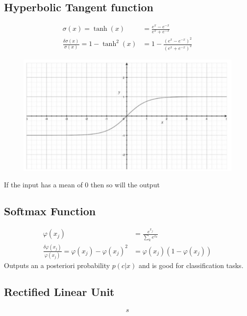 \subsection{Hyperbolic Tangent function}
\label{ssect:hyperbolic-tangent-function}
\begin{align*}
\sigma(x) = \tanh(x) &= \frac{e^x - e^{-x}}{e^x + e^{-x}} \\
\frac{\delta \sigma(x)}{\sigma(x)} = 1 - \tanh^2(x) &= 1 - \frac{(e^x - e^{-x})^2}{(e^x + e^{-x})^2}
\end{align*}
\begin{figure}[h]
\includegraphics[scale=0.6]{tanh}
\end{figure}
If the input has a mean of 0 then so will the output

\subsection{Softmax Function}
\label{ssect:softmax-function}
\begin{align*}
\varphi(x_j) &= \frac{e^{x_j}}{\sum_k e^{x_k}} \\
\frac{\delta \varphi(x_j)}{\varphi(x_j)} = \varphi(x_j) - \varphi(x_j)^2 &= \varphi(x_j)(1 - \varphi(x_j))
\end{align*}
Outputs an a posteriori probability $p(c | x)$ and is good for classification tasks.

\subsection{Rectified Linear Unit}
\label{ssect:softmax-function}
\begin{align*}
s
\end{align*}
\newpage